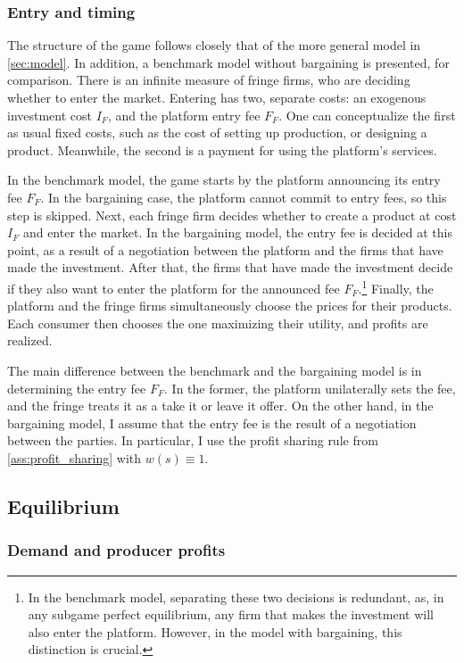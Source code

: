 \documentclass[a4paper]{article}
\begin{document}
\subsubsection{Entry and timing}

The structure of the game follows closely that of the more general model in \cref{sec:model}.
In addition, a benchmark model without bargaining is presented, for comparison.
There is an infinite measure of fringe firms, who are deciding whether to enter the market.
Entering has two, separate costs: an exogenous investment cost $I_F$, and the platform entry fee $F_F$.
One can conceptualize the first as usual fixed costs, such as the cost of setting up production, or designing a product.
Meanwhile, the second is a payment for using the platform's services.

In the benchmark model, the game starts by the platform announcing its entry fee $F_F$.
In the bargaining case, the platform cannot commit to entry fees, so this step is skipped.
Next, each fringe firm decides whether to create a product at cost $I_F$ and enter the market.
In the bargaining model, the entry fee is decided at this point, as a result of a negotiation between the platform and the firms that have made the investment.
After that, the firms that have made the investment decide if they also want to enter the platform for the announced fee $F_F$.\footnote{
    In the benchmark model, separating these two decisions is redundant, as, in any subgame perfect equilibrium, any firm that makes the investment will also enter the platform.
    However, in the model with bargaining, this distinction is crucial.
}
Finally, the platform and the fringe firms simultaneously choose the prices for their products.
Each consumer then chooses the one maximizing their utility, and profits are realized.

The main difference between the benchmark and the bargaining model is in determining the entry fee $F_F$.
In the former, the platform unilaterally sets the fee, and the fringe treats it as a take it or leave it offer.
On the other hand, in the bargaining model, I assume that the entry fee is the result of a negotiation between the parties.
In particular, I use the profit sharing rule from \cref{ass:profit_sharing} with $w(s) \equiv 1$.


\subsection{Equilibrium}

\subsubsection{Demand and producer profits}
\end{document}
